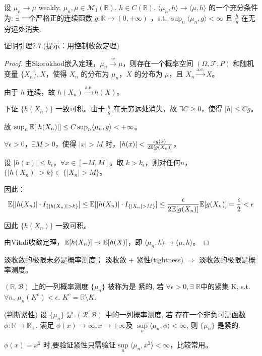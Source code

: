 \begin{lemma}
     设 $\mu_n \rightarrow \mu$ weakly, $\mu_n, \mu \in \mathcal{M}_1(\mathbb{R})$. $h \in C(\mathbb{R})$.
$\langle \mu_n, h \rangle \rightarrow \langle \mu, h \rangle$ 的一个充分条件为:
$\exists$ 一个严格正的连续函数 $g: \mathbb{R} \rightarrow (0, +\infty)$
，s.t. $\sup_n \langle \mu_n, g \rangle < \infty$ 且 $\frac{h}{g}$ 在无穷远处消失.

\end{lemma}
\begin{6}
证明引理2.7.(提示：用控制收敛定理)
\end{6}
\begin{proof}
    
由Skorokhod嵌入定理，$\mu_n \xrightarrow{w} \mu$，则存在一个概率空间 $(\Omega, \mathcal{F}, P)$ 和随机变量 $\{X_n\}, X$，使得 $X_n$ 的分布为 $\mu_n$，$X$ 的分布为 $\mu$，且 $X_n \xrightarrow{\text{a.e.}} X$。

由于 $h$ 连续，故 $h(X_n) \xrightarrow{\text{a.e.}} h(X)$。

下证 $\{h(X_n)\}$ 一致可积。由于 $\frac{h}{g}$ 在无穷远处消失，故 $\exists C \geq 0$，使得 $|h| \leq Cg$。

故 $\sup_n \mathbb{E}[|h(X_n)|] \leq C \sup_n \langle \mu_n, g \rangle < +\infty$。

$\forall \epsilon > 0$，$\exists M > 0$，使得 $|x| > M$ 时，$|h(x)| < \frac{\epsilon g(x)}{2\mathbb{E}[g(X_n)]}$。

设 $|h(x)| \leq k_\epsilon$，$\forall x \in [-M, M]$。取 $k > k_\epsilon$，则对任何$n$， $\{|h(X_n)| > k\} \subset \{|X_n| > M\}$。

因此：
\[
\mathbb{E}[|h(X_n)| \cdot I_{\{|h(X_n)| > k\}}] \leq \mathbb{E}[|h(X_n)| \cdot I_{\{|X_n| > M\}}] \leq \frac{\epsilon}{2\mathbb{E}[g(X_n)]} \mathbb{E}[g(X_n)] =\frac\epsilon2< \epsilon
\]

因此 $\{h(X_n)\}$ 一致可积。

由Vitali收敛定理，$\mathbb{E}[h(X_n)] \to \mathbb{E}[h(X)]$，即 $\langle \mu_n, h \rangle \to \langle \mu, h \rangle$。
\end{proof}


淡收敛的极限未必是概率测度；
淡收敛 + 紧性(tightness) $\Rightarrow$ 淡收敛的极限是概率测度。
\begin{definition}
    $(\mathbb{R}, \mathcal{B})$ 上的一列概率测度 $\{\mu_n\}$ 被称为是
紧的, 若 $\forall \epsilon > 0, \exists$ $\mathbb{R}$中的紧集 K, s.t. $\forall n$, $\mu_n(K^c) < \epsilon$.
$K^c = \mathbb{R} \setminus K$.
\end{definition}

\begin{lemma}{(判断紧性)}
设 $\{\mu_n\}$ 是 $(\mathcal{R}, \mathcal{B})$ 中的一列概率测度, 若
存在一个非负可测函数 $\phi : \mathbb{R} \rightarrow \mathbb{R}_+$. 满足 $\phi(x) \rightarrow \infty, x \rightarrow \pm \infty$及
$\sup\limits_n \langle \mu_n, \phi \rangle < \infty$, 则 $\{\mu_n\}$ 是紧的.
\end{lemma}
\begin{remark}
    $\phi(x) = x^2$ 时,要验证紧性只需验证$\sup\limits_n \langle \mu_n, x^2 \rangle < \infty$，比较常用。
\end{remark} 

